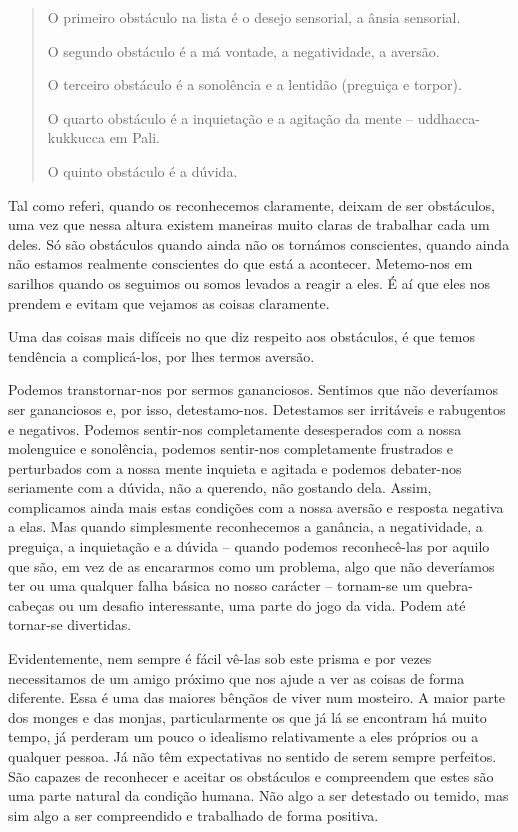 \begin{quote}
  O primeiro obstáculo na lista é o desejo sensorial, a ânsia sensorial.

  O segundo obstáculo é a má vontade, a negatividade, a aversão.

  O terceiro obstáculo é a sonolência e a lentidão (preguiça e torpor).

  O quarto obstáculo é a inquietação e a agitação da mente -- uddhacca-kukkucca em Pali.

  O quinto obstáculo é a dúvida.
\end{quote}

Tal como referi, quando os reconhecemos claramente, deixam de ser
obstáculos, uma vez que nessa altura existem maneiras muito claras de
trabalhar cada um deles. Só são obstáculos quando ainda não os tornámos
conscientes, quando ainda não estamos realmente conscientes do que está
a acontecer. Metemo-nos em sarilhos quando os seguimos ou somos levados
a reagir a eles. É aí que eles nos prendem e evitam que vejamos as
coisas claramente.

Uma das coisas mais difíceis no que diz respeito aos obstáculos, é que
temos tendência a complicá-los, por lhes termos aversão.

Podemos transtornar-nos por sermos gananciosos. Sentimos que não
deveríamos ser gananciosos e, por isso, detestamo-nos. Detestamos ser
irritáveis e rabugentos e negativos. Podemos sentir-nos completamente
desesperados com a nossa molenguice e sonolência, podemos sentir-nos
completamente frustrados e perturbados com a nossa mente inquieta e
agitada e podemos debater-nos seriamente com a dúvida, não a querendo,
não gostando dela. Assim, complicamos ainda mais estas condições com a
nossa aversão e resposta negativa a elas. Mas quando simplesmente
reconhecemos a ganância, a negatividade, a preguiça, a inquietação e a
dúvida -- quando podemos reconhecê-las por aquilo que são, em vez de as
encararmos como um problema, algo que não deveríamos ter ou uma qualquer
falha básica no nosso carácter -- tornam-se um quebra-cabeças ou um
desafio interessante, uma parte do jogo da vida. Podem até tornar-se
divertidas.

Evidentemente, nem sempre é fácil vê-las sob este prisma e por vezes
necessitamos de um amigo próximo que nos ajude a ver as coisas de forma
diferente. Essa é uma das maiores bênçãos de viver num mosteiro. A maior
parte dos monges e das monjas, particularmente os que já lá se encontram
há muito tempo, já perderam um pouco o idealismo relativamente a eles
próprios ou a qualquer pessoa. Já não têm expectativas no sentido de
serem sempre perfeitos. São capazes de reconhecer e aceitar os
obstáculos e compreendem que estes são uma parte natural da condição
humana. Não algo a ser detestado ou temido, mas sim algo a ser
compreendido e trabalhado de forma positiva.

